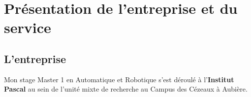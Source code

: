 \documentclass[12pt,a4paper,oneside]{report}
\begin{document}

\newpage

\thispagestyle{empty}
\tableofcontents

\newpage


\chapter{Présentation de l'entreprise et du service}

\section{L'entreprise}
Mon stage Master 1 en Automatique et Robotique s'est déroulé à l'\textbf{Institut Pascal} au sein de l'unité mixte de recherche au Campus des Cézeaux à Aubière.
\end{document}
